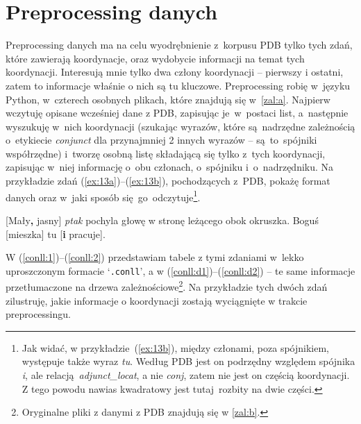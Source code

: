 \documentclass[licencjacka]{pracamgr_Kogni}
\begin{document}
    \section{Preprocessing danych}\label{sec:preprocessing-danych}
    Preprocessing danych ma na celu wyodrębnienie z~korpusu PDB tylko tych zdań, które zawierają koordynacje, oraz wydobycie informacji na temat tych koordynacji.
    Interesują mnie tylko dwa człony koordynacji -- pierwszy i ostatni, zatem to informacje właśnie o nich są tu kluczowe.
    Preprocessing robię w~języku Python, w~czterech osobnych plikach, które znajdują się w~\ref{zal:a}.
    Najpierw wczytuję opisane wcześniej dane z PDB, zapisując je~w~postaci list, a~następnie wyszukuję w~nich koordynacji (szukając wyrazów, które są~nadrzędne zależnością o~etykiecie \textit{conjunct} dla przynajmniej 2 innych wyrazów -- są~to~spójniki współrzędne) i~tworzę osobną listę składającą się tylko z~tych koordynacji, zapisując w~niej informację o~obu członach, o~spójniku i~o~nadrzędniku.
    Na przykładzie zdań (\ref{ex:13a})--(\ref{ex:13b}), pochodzących z~PDB, pokażę format danych oraz w~jaki sposób się~go~odczytuje\footnote{Jak widać, w przykładzie~(\ref{ex:13b}), między członami, poza spójnikiem, występuje także wyraz \textit{tu}. Według PDB jest on podrzędny względem spójnika \textit{i}, ale relacją~\textit{adjunct\_locat}, a nie \textit{conj}, zatem nie jest on częścią koordynacji. Z tego powodu nawias kwadratowy jest tutaj~rozbity na dwie części.}.
    \begin{exe}
        \ex
        {[Mały\textbf{\LARGE{,}} jasny] \textit{ptak} pochyla głowę w stronę leżącego obok okruszka.
            \label{ex:13a}}
        \ex
        {Boguś [mieszka] tu [\textbf{i} pracuje].
            \label{ex:13b}}
    \end{exe}
    W (\ref{conll:1})--(\ref{conll:2}) przedstawiam tabele z tymi zdaniami w~lekko uproszczonym formacie `\texttt{.conll}', a w (\ref{conll:d1})--(\ref{conll:d2}) -- te same informacje przetłumaczone na drzewa zależnościowe\footnote{Oryginalne pliki z danymi z PDB znajdują się w \ref{zal:b}.}. Na przykładzie tych dwóch zdań zilustruję, jakie informacje o koordynacji zostają wyciągnięte w trakcie preprocessingu.
    \begin{exe}
        \ex
        \label{conll:1}
    \end{exe}
\end{document}
